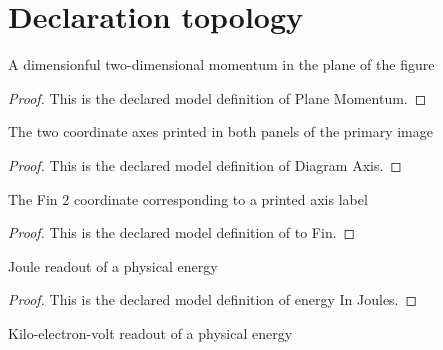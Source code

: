 \section{Declaration topology}
\begin{definition}
  \label{def:physics:phyx-mini-0569:phyxminiproblems-problemphyxmini0569-planemomentum}
  A dimensionful two-dimensional momentum in the plane of the figure
\end{definition}
\begin{proof}
  This is the declared model definition of Plane Momentum.
\end{proof}
\begin{definition}
  \label{def:physics:phyx-mini-0569:phyxminiproblems-problemphyxmini0569-diagramaxis}
  The two coordinate axes printed in both panels of the primary image
\end{definition}
\begin{proof}
  This is the declared model definition of Diagram Axis.
\end{proof}
\begin{definition}[to Fin]
  \label{def:physics:phyx-mini-0569:phyxminiproblems-problemphyxmini0569-diagramaxis-tofin}
  The Fin 2 coordinate corresponding to a printed axis label
\end{definition}
\begin{proof}
  This is the declared model definition of to Fin.
\end{proof}
\begin{definition}
  \label{def:physics:phyx-mini-0569:phyxminiproblems-problemphyxmini0569-energyinjoules}
  Joule readout of a physical energy
\end{definition}
\begin{proof}
  This is the declared model definition of energy In Joules.
\end{proof}
\begin{definition}
  \label{def:physics:phyx-mini-0569:phyxminiproblems-problemphyxmini0569-energyinkiloelectronvolts}
  Kilo-electron-volt readout of a physical energy
\end{definition}
